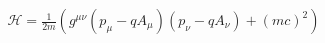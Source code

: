 \documentclass[preview]{standalone}
\begin{document}
\begin{align*}
\mathcal{H}=\frac{1}{2m}\left(g^{\mu\nu}(p_\mu-qA_\mu)(p_\nu-qA_\nu)+(mc)^2\right)
\end{align*}
\end{document}

